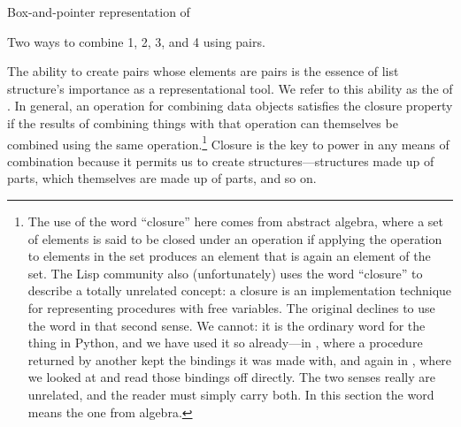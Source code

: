 \begin{imageFigure}{Box-and-pointer representation of }
  
\end{imageFigure}

\begin{imageFigure}{Two ways to combine 1, 2, 3, and 4 using pairs.}
  \resizebox{\linewidth}{!}{}
\end{imageFigure}

The ability to create pairs whose elements are pairs is the essence of list
structure's importance as a representational tool.  We refer to this ability as
the  of .  In general, an operation for
combining data objects satisfies the closure property if the results of
combining things with that operation can themselves be combined using the same
operation.\footnote{The use of the word ``closure'' here comes from abstract
algebra, where a set of elements is said to be closed under an operation if
applying the operation to elements in the set produces an element that is again
an element of the set.  The Lisp community also (unfortunately) uses the word
``closure'' to describe a totally unrelated concept: a closure is an
implementation technique for representing procedures with free variables.  The
original declines to use the word in that second sense.  We cannot: it is the
ordinary word for the thing in Python, and we have used it so already---in
, where a procedure returned by another kept the bindings it
was made with, and again in , where we looked at
 and read those bindings off directly.  The two senses really
are unrelated, and the reader must simply carry both.  In this section the word
means the one from algebra.} Closure
is the key to power in any means of combination because it permits us to create
 structures---structures made up of parts, which
themselves are made up of parts, and so on.


